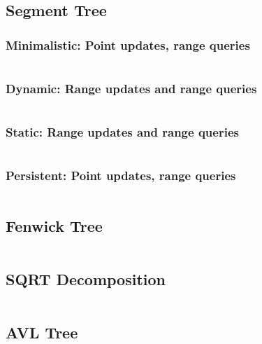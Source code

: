 \documentclass[11pt]{article}
\begin{document}
		\subsection{Segment Tree}
			\subsubsection{Minimalistic: Point updates, range queries}
			\inputminted[tabsize=2,breaklines,firstline=4,lastline=47,fontsize=\small]{c++}{queries.cpp}
			
			\subsubsection{Dynamic: Range updates and range queries}
			\inputminted[tabsize=2,breaklines,firstline=49,lastline=100,fontsize=\small]{c++}{queries.cpp}
			
			\subsubsection{Static: Range updates and range queries}
			\inputminted[tabsize=2,breaklines,firstline=102,lastline=171,fontsize=\small]{c++}{queries.cpp}
			
			\subsubsection{Persistent: Point updates, range queries}
			\inputminted[tabsize=2,breaklines,firstline=173,lastline=203,fontsize=\small]{c++}{queries.cpp}
		
		\subsection{Fenwick Tree}
		\inputminted[tabsize=2,breaklines,firstline=205,lastline=242,fontsize=\small]{c++}{queries.cpp}
		
		\subsection{SQRT Decomposition}
		\inputminted[tabsize=2,breaklines,firstline=244,lastline=322,fontsize=\small]{c++}{queries.cpp}
		
		\subsection{AVL Tree}
		\inputminted[tabsize=2,breaklines,firstline=324,lastline=529,fontsize=\small]{c++}{queries.cpp}
		
\end{document}
